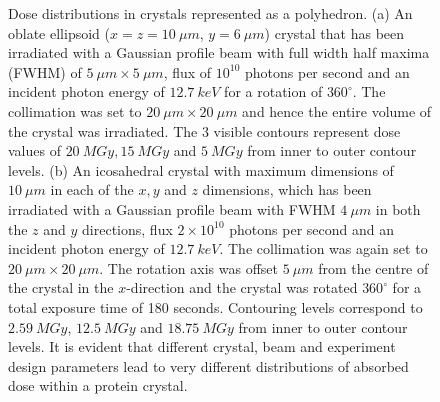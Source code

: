 \begin{figure}
\begin{subfigure}[b]{0.437\textwidth}
                    \caption{}
                    \label{fig:Icosohedral crystal}
            \end{subfigure}
            \caption{Dose distributions in crystals represented as a polyhedron.
            (a) An oblate ellipsoid ($x = z = 10\ \mu m$, $y = 6\ \mu m$) crystal that has been irradiated with a Gaussian profile beam with full width half maxima (FWHM) of $5\ \mu m \times 5\ \mu m$, flux of $10^{10}$ photons per second and an incident photon energy of $12.7\ keV$ for a rotation of $360^{\circ}$.
            The collimation was set to $20\ \mu m \times 20\ \mu m$ and hence the entire volume of the crystal was irradiated.
            The 3 visible contours represent dose values of $20\ MGy, 15\ MGy$ and $5\ MGy$ from inner to outer contour levels.
            (b) An icosahedral crystal with maximum dimensions of $10\ \mu m$ in each of the $x, y$ and $z$ dimensions, which has been irradiated with a Gaussian profile beam with FWHM $4\ \mu m$ in both the $z$ and $y$ directions, flux $2 \times 10^{10}$ photons per second and an incident photon energy of $12.7\ keV$.
            The collimation was again set to $20\ \mu m \times 20\ \mu m$.
            The rotation axis was offset $5\ \mu m$ from the centre of the crystal in the $x$-direction and the crystal was rotated $360^{\circ}$ for a total exposure time of 180 seconds.
            Contouring levels correspond to $2.59\ MGy$, $12.5\ MGy$ and $18.75\ MGy$ from inner to outer contour levels.
            It is evident that different crystal, beam and experiment design parameters lead to very different distributions of absorbed dose within a protein crystal.}
            \label{fig:RADDOSE-3D Polyhedral Crystal Examples}
        \end{figure}

